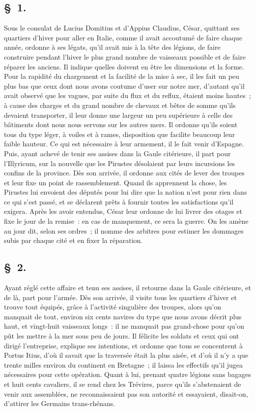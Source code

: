 \documentclass[french,twoside]{book} %
\begin{document}
\subsection[{§ 1.}]{ \textsc{§ 1.} }
\noindent Sous le consulat de Lucius Domitius et d’Appius Claudius, César, quittant ses quartiers d’hiver pour aller en Italie, comme il avait accoutumé de faire chaque année, ordonne à ses légats, qu’il avait mis à la tête des légions, de faire construire pendant l’hiver le plus grand nombre de vaisseaux possible et de faire réparer les anciens. Il indique quelles doivent en être les dimensions et la forme. Pour la rapidité du chargement et la facilité de la mise à sec, il les fait un peu plus bas que ceux dont nous avons coutume d’user sur notre mer, d’autant qu’il avait observé que les vagues, par suite du flux et du reflux, étaient moins hautes ; à cause des charges et du grand nombre de chevaux et bêtes de somme qu’ils devaient transporter, il leur donne une largeur un peu supérieure à celle des bâtiments dont nous nous servons sur les autres mers. Il ordonne qu’ils soient tous du type léger, à voiles et à rames, disposition que facilite beaucoup leur faible hauteur. Ce qui est nécessaire à leur armement, il le fait venir d’Espagne. Puis, ayant achevé de tenir ses assises dans la Gaule citérieure, il part pour l’Illyricum, sur la nouvelle que les Pirustes désolaient par leurs incursions les confins de la province. Dès son arrivée, il ordonne aux cités de lever des troupes et leur fixe un point de rassemblement. Quand ils apprennent la chose, les Pirustes lui envoient des députés pour lui dire que la nation n’est pour rien dans ce qui s’est passé, et se déclarent prêts à fournir toutes les satisfactions qu’il exigera. Après les avoir entendus, César leur ordonne de lui livrer des otages et fixe le jour de la remise : en cas de manquement, ce sera la guerre. On les amène au jour dit, selon ses ordres ; il nomme des arbitres pour estimer les dommages subis par chaque cité et en fixer la réparation.
\subsection[{§ 2.}]{ \textsc{§ 2.} }
\noindent Ayant réglé cette affaire et tenu ses assises, il retourne dans la Gaule citérieure, et de là, part pour l’armée. Dès son arrivée, il visite tous les quartiers d’hiver et trouve tout équipés, grâce à l’activité singulière des troupes, alors qu’on manquait de tout, environ six cents navires du type que nous avons décrit plus haut, et vingt-huit vaisseaux longs : il ne manquait pas grand-chose pour qu’on pût les mettre à la mer sous peu de jours. Il félicite les soldats et ceux qui ont dirigé l’entreprise, explique ses intentions, et ordonne que tous se concentrent à Portus Itius, d’où il savait que la traversée était la plus aisée, et d’où il n’y a que trente milles environ du continent en Bretagne ; il laissa les effectifs qu’il jugea nécessaires pour cette opération. Quant à lui, prenant quatre légions sans bagages et huit cents cavaliers, il se rend chez les Trévires, parce qu’ils s’abstenaient de venir aux assemblées, ne reconnaissaient pas son autorité et essayaient, disait-on, d’attirer les Germains trans-rhénans.
\end{document}
